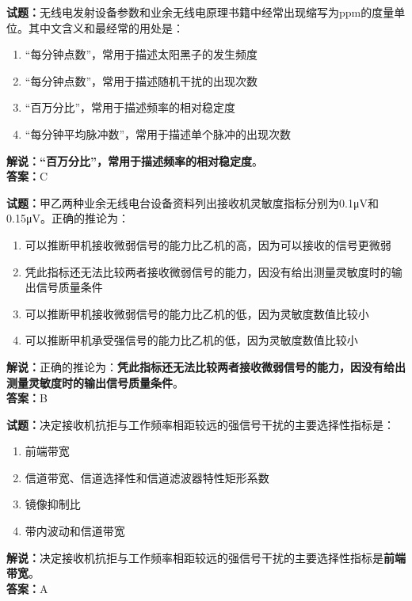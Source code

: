 \documentclass{ctexbook}
\begin{document}
\vspace{1em}

\textbf{试题：}无线电发射设备参数和业余无线电原理书籍中经常出现缩写为ppm的度量单位。其中文含义和最经常的用处是：
\begin{enumerate}[leftmargin=3em]
  \item “每分钟点数”，常用于描述太阳黑子的发生频度
  \item “每分钟点数”，常用于描述随机干扰的出现次数
  \item “百万分比”，常用于描述频率的相对稳定度
  \item “每分钟平均脉冲数”，常用于描述单个脉冲的出现次数
\end{enumerate}
\noindent\textbf{解说：}\textbf{“百万分比”，常用于描述频率的相对稳定度}。\\\noindent\textbf{答案：}C


\vspace{1em}

\textbf{试题：}甲乙两种业余无线电台设备资料列出接收机灵敏度指标分别为0.1μV和0.15μV。正确的推论为：
\begin{enumerate}[leftmargin=3em]
  \item 可以推断甲机接收微弱信号的能力比乙机的高，因为可以接收的信号更微弱
  \item 凭此指标还无法比较两者接收微弱信号的能力，因没有给出测量灵敏度时的输出信号质量条件
  \item 可以推断甲机接收微弱信号的能力比乙机的低，因为灵敏度数值比较小
  \item 可以推断甲机承受强信号的能力比乙机的低，因为灵敏度数值比较小
\end{enumerate}
\noindent\textbf{解说：}正确的推论为：\textbf{凭此指标还无法比较两者接收微弱信号的能力，因没有给出测量灵敏度时的输出信号质量条件}。\\\noindent\textbf{答案：}B


\vspace{1em}

\textbf{试题：}决定接收机抗拒与工作频率相距较远的强信号干扰的主要选择性指标是：
\begin{enumerate}[leftmargin=3em]
  \item 前端带宽
  \item 信道带宽、信道选择性和信道滤波器特性矩形系数
  \item 镜像抑制比
  \item 带内波动和信道带宽
\end{enumerate}
\noindent\textbf{解说：}决定接收机抗拒与工作频率相距较远的强信号干扰的主要选择性指标是\textbf{前端带宽}。\\\noindent\textbf{答案：}A
\end{document}
